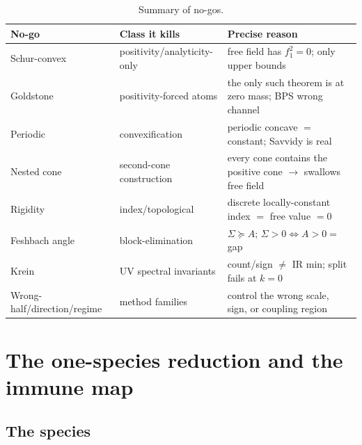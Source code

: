\begin{table}[t]
\centering
\small
\begin{tabularx}{\textwidth}{@{}>{\raggedright\arraybackslash}p{2.9cm}
  >{\raggedright\arraybackslash}p{4.4cm}>{\raggedright\arraybackslash}X@{}}
\toprule
\textbf{No-go} & \textbf{Class it kills} & \textbf{Precise reason}\\
\midrule
Schur-convex & positivity/analyticity-only & free field has $f_1^2=0$; only upper bounds\\
Goldstone & positivity-forced atoms & the only such theorem is at zero mass; BPS wrong channel\\
Periodic & convexification & periodic concave $=$ constant; Savvidy is real\\
Nested cone & second-cone construction & every cone contains the positive cone $\to$ swallows
  free field\\
Rigidity & index/topological & discrete locally-constant index $=$ free value $=0$\\
Feshbach angle & block-elimination & $\Sigma\succeq A$; $\Sigma>0\iff A>0=$ gap\\
Krein & UV spectral invariants & count/sign $\ne$ IR min; split fails at $k=0$\\
Wrong-half/direction/regime & method families & control the wrong scale, sign, or coupling
  region\\
\bottomrule
\end{tabularx}
\caption{Summary of no-gos.}
\label{tab:nogos}
\end{table}

\section{The one-species reduction and the immune map}
\label{sec:species}

\subsection{The species}

